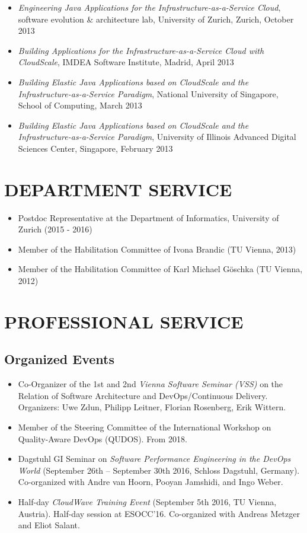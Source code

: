 \documentclass[paper=letter,fontsize=11pt]{scrartcl} %
\newcommand{\NewPart}[2]{\section*{\uppercase{#1} #2}}
\begin{document}
\begin{itemize}
\item \emph{Engineering Java Applications for the Infrastructure-as-a-Service Cloud}, software evolution \& architecture lab, University of Zurich, Zurich, October 2013
\item \emph{Building Applications for the Infrastructure-as-a-Service Cloud with CloudScale}, IMDEA Software Institute, Madrid, April 2013
\item \emph{Building Elastic Java Applications based on CloudScale and the Infrastructure-as-a-Service Paradigm}, National University of Singapore, School of Computing, March 2013
\item \emph{Building Elastic Java Applications based on CloudScale and the Infrastructure-as-a-Service Paradigm}, University of Illinois Advanced Digital Sciences Center, Singapore, February 2013
\end{itemize}

\NewPart{Department Service}{}
\begin{itemize}
\item Postdoc Representative at the Department of Informatics, University of Zurich (2015 - 2016)
\item Member of the Habilitation Committee of Ivona Brandic (TU Vienna, 2013)
\item Member of the Habilitation Committee of Karl Michael G\"oschka (TU Vienna, 2012)
\end{itemize}

\NewPart{Professional Service}{}

\subsection*{Organized Events}
\begin{itemize}
\item Co-Organizer of the 1st and 2nd \emph{Vienna Software Seminar (VSS)} on the Relation of Software Architecture and DevOps/Continuous Delivery. Organizers: Uwe Zdun, Philipp Leitner, Florian Rosenberg, Erik Wittern.
\item Member of the Steering Committee of the International Workshop on Quality-Aware DevOps (QUDOS). From 2018.
\item Dagstuhl GI Seminar on \emph{Software Performance Engineering in the DevOps World} (September 26th – September 30th 2016, Schloss Dagstuhl, Germany). Co-organized with Andre van Hoorn, Pooyan Jamshidi, and Ingo Weber.
\item Half-day \emph{CloudWave Training Event} (September 5th 2016, TU Vienna, Austria). Half-day session at ESOCC'16. Co-organized with Andreas Metzger and Eliot Salant.
\end{itemize}
\end{document}
